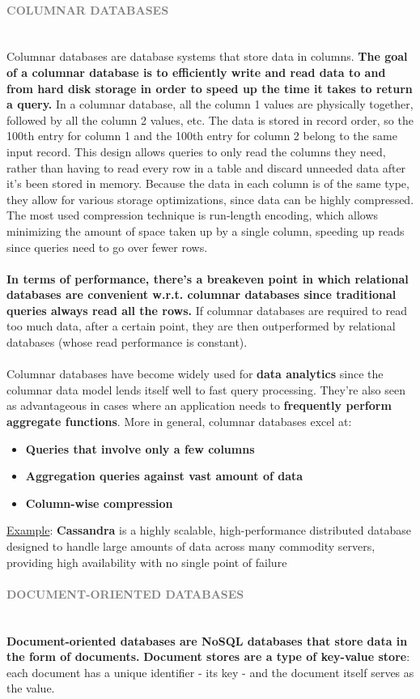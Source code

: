 \documentclass[10pt,a4paper]{article}
\newcommand{\nline}{\\~\\}
\newcommand{\myparagraph}[1]{\paragraph{\normalsize{\textcolor{gray}{\uppercase{\textbf{#1}}}} }\mbox{} \vspace{0.5em}\\}
\begin{document}
\myparagraph{Columnar Databases}
Columnar databases are database systems that store data in columns. \textbf{The goal of a columnar database is to efficiently write and read data to and from hard disk storage in order to speed up the time it takes to return a query.} In a columnar database, all the column 1 values are physically together, followed by all the column 2 values, etc. The data is stored in record order, so the 100th entry for column 1 and the 100th entry for column 2 belong to the same input record. This design allows queries to only read the columns they need, rather than having to read every row in a table and discard unneeded data after it’s been stored in memory. Because the data in each column is of the same type, they allow for various storage optimizations, since data can be highly compressed. The most used compression technique is run-length encoding, which allows minimizing the amount of space taken up by a single column, speeding up reads since queries need to go over fewer rows.		
\nline
\textbf{In terms of performance, there’s a breakeven point in which relational databases are convenient w.r.t. columnar databases since traditional queries always read all the rows.} If columnar databases are required to read too much data, after a certain point, they are then outperformed by relational databases (whose read performance is constant).
\nline
Columnar databases have become widely used for \textbf{data analytics} since the columnar data model lends itself well to fast query processing. They’re also seen as advantageous in cases where an application needs to \textbf{frequently perform aggregate functions}.
More in general, columnar databases excel at:
\begin{itemize}
	\item \textbf{Queries that involve only a few columns}
	\item \textbf{Aggregation queries against vast amount of data}
	\item \textbf{Column-wise compression}
\end{itemize}
\uline{Example}: \textbf{Cassandra} is a highly scalable, high-performance distributed database designed to handle large amounts of data across many commodity servers, providing high availability with no single point of failure
\pagebreak
\myparagraph{Document-oriented databases}
\textbf{Document-oriented databases are NoSQL databases that store data in the form of documents.} \textbf{Document stores are a type of key-value store}: each document has a unique identifier - its key - and the document itself serves as the value. 		\\
\end{document}
